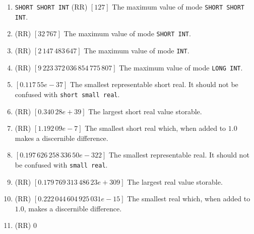 \begin{enumerate}
\item \verb|SHORT SHORT INT|  (RR) $[127]$\newline
The maximum value of mode \verb|SHORT SHORT INT|.
\item {} (RR) $[32\,767]$ \newline
The maximum value of mode \verb|SHORT INT|.
\item {} (RR) $[2\,147\,483\,647]$ \newline
The maximum value of mode \verb|INT|.
\item {} (RR)\newline
$[9\,223\,372\,036\,854\,775\,807]$ \newline
The maximum value of mode \verb|LONG INT|.
\item {} $[0.117\,55e-37]$ \newline
The smallest representable short real. It should not be confused with
\verb|short small real|.
\item {} (RR) $[0.340\,28e+39]$ \newline
The largest short real value storable.
\item {} (RR)\newline
$[1.192\,09e-7]$\newline
The smallest short real which, when added to $1.0$ makes a discernible
difference.
\item {}
 $[0.197\,626\,258\,336\,50e-322]$\hfil \newline
The smallest representable real. It should not be confused with
\verb|small real|.
\item {}
 (RR) $[0.179\,769\,313\,486\,23e+309]$\hfil\newline
The largest real value storable.
\item {}
 (RR) $[0.222\,044\,604\,925\,031e-15]$\hfil\newline
The smallest real which, when added to $1.0$, makes a discernible
difference.
\item {} (RR) $0$
\end{enumerate}


